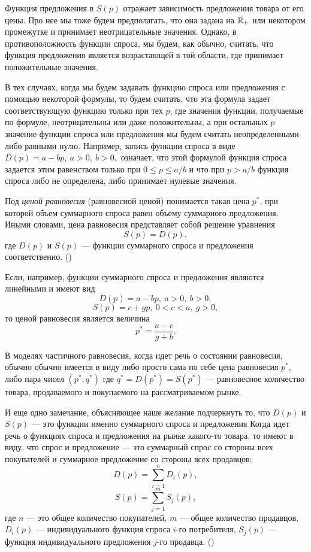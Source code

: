     Функция предложения в $S(p)$ отражает зависимость предложения товара
    от его цены.
    Про нее мы тоже будем предполагать, что она задана на $\mathbb{R}_{+}$
    или некотором промежутке и
    принимает неотрицательные значения. Однако, в противоположность
    функции спроса, мы будем, как обычно, считать, что функция предложения
    является возрастающей в той области, где принимает положительные значения.

    В тех случаях, когда мы будем задавать функцию спроса или
    предложения с помощью некоторой формулы, то будем считать, что
    эта формула задает соответствующую функцию только при тех $p$,
    где значения функции, получаемые по формуле, неотрицательны или
    даже положительны, а
    при остальных $p$ значение функции спроса или предложения мы
    будем считать неопределенными либо равными нулю. Например, запись функции спроса в
    виде $D(p)=a-bp, \ a>0, \ b>0,$ означает, что этой формулой
    функция спроса задается этим равенством только при $0\leq p\leq a/b$
    и что при $p>a/b$ функция спроса либо не определена, либо  принимает
    нулевые значения.

    Под \emph{ценой равновесия} (равновесной ценой)
    понимается такая цена $p^{*}$, при которой объем суммарного спроса равен
    объему суммарного предложения. Иными словами, цена равновесия представляет
    собой решение уравнения
    \[S(p)=D(p),  \]
    где $D(p)$ и $S(p)$ --- функции суммарного спроса и предложения
    соответственно.
    ()

    Если, например, функции суммарного спроса и предложения являются
    линейными и имеют вид
    \[D(p)=a-bp, \ a>0, \ b>0,\]
    \[S(p)=c+gp, \ 0<c<a, \ g>0,\]
    то ценой равновесия является величина
    \[p^{*}=\frac{a-c}{g+b}.\]

    В моделях частичного равновесия, когда идет речь о состоянии
    равновесия, обычно обычно имеется в виду либо просто сама по себе
    цена равновесия $p^{*}$, либо пара чисел $(p^{*},q^{*})$ где
    $q^{*}=D(p^{*})=S(p^{*})$ --- равновесное количество
    товара, продаваемого и покупаемого на рассматриваемом рынке.


    И еще одно замечание, объясняющее наше желание подчеркнуть то, что
    $D(p)$ и $S(p)$ --- это функции именно суммарного спроса и предложения
     Когда идет речь о функциях спроса и предложения на
    рынке какого-то товара, то имеют в виду, что спрос и предложение
    --- это суммарный спрос со стороны всех покупателей и суммарное
    предложение со стороны всех продавцов:
    \[D(p)=\sum_{i=1}^{n}D_{i}(p),\]
    \[S(p)=\sum_{j=1}^{m}S_{j}(p),\]
    где $n$ --- это общее количество покупателей, $m$ --- общее
    количество продавцов, $D_{i}(p)$ --- индивидуального функция
    спроса $i$-го потребителя, $S_{j}(p)$ ---
    функция индивидуального предложения $j$-го продавца.
    ()

